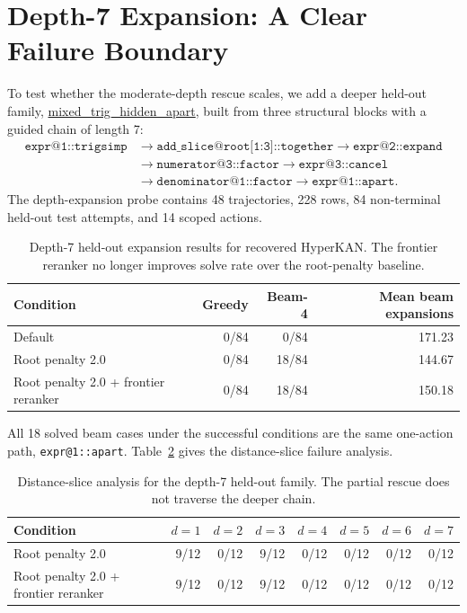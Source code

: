 \documentclass[11pt]{article}
\newcommand{\hyperkan}{HyperKAN}
\begin{document}
\section{Depth-7 Expansion: A Clear Failure Boundary}

To test whether the moderate-depth rescue scales, we add a deeper held-out family, \url{mixed_trig_hidden_apart}, built from three structural blocks with a guided chain of length 7:
\[
\begin{aligned}
\texttt{expr@1::trigsimp}
&\rightarrow \texttt{add\_slice@root[1:3]::together}
\rightarrow \texttt{expr@2::expand}\\
&\rightarrow \texttt{numerator@3::factor}
\rightarrow \texttt{expr@3::cancel}\\
&\rightarrow \texttt{denominator@1::factor}
\rightarrow \texttt{expr@1::apart}.
\end{aligned}
\]
The depth-expansion probe contains 48 trajectories, 228 rows, 84 non-terminal held-out test attempts, and 14 scoped actions.

\begin{table}[t]
\centering
\caption{Depth-7 held-out expansion results for recovered \hyperkan{}. The frontier reranker no longer improves solve rate over the root-penalty baseline.}
\label{tab:depth7}
\begin{tabular}{lrrr}
\toprule
Condition & Greedy & Beam-4 & Mean beam expansions\\
\midrule
Default & 0/84 & 0/84 & 171.23\\
Root penalty 2.0 & 0/84 & 18/84 & 144.67\\
Root penalty 2.0 + frontier reranker & 0/84 & 18/84 & 150.18\\
\bottomrule
\end{tabular}
\end{table}

All 18 solved beam cases under the successful conditions are the same one-action path, \texttt{expr@1::apart}. Table~\ref{tab:distance-slice} gives the distance-slice failure analysis.

\begin{table}[t]
\centering
\caption{Distance-slice analysis for the depth-7 held-out family. The partial rescue does not traverse the deeper chain.}
\label{tab:distance-slice}
\begin{tabular}{lrrrrrrr}
\toprule
Condition & $d=1$ & $d=2$ & $d=3$ & $d=4$ & $d=5$ & $d=6$ & $d=7$\\
\midrule
Root penalty 2.0 & 9/12 & 0/12 & 9/12 & 0/12 & 0/12 & 0/12 & 0/12\\
Root penalty 2.0 + frontier reranker & 9/12 & 0/12 & 9/12 & 0/12 & 0/12 & 0/12 & 0/12\\
\bottomrule
\end{tabular}
\end{table}
\end{document}
